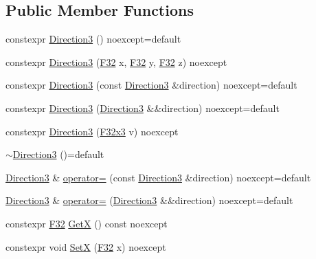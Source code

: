 \subsection*{Public Member Functions}
\begin{DoxyCompactItemize}
\item 
constexpr \mbox{\hyperlink{structmage_1_1_direction3_a64dd4745147f5fd39f710e8b9591074a}{Direction3}} () noexcept=default
\item 
constexpr \mbox{\hyperlink{structmage_1_1_direction3_a880d7413dc6f3742b53a089b870018c7}{Direction3}} (\mbox{\hyperlink{namespacemage_aa97e833b45f06d60a0a9c4fc22ae02c0}{F32}} x, \mbox{\hyperlink{namespacemage_aa97e833b45f06d60a0a9c4fc22ae02c0}{F32}} y, \mbox{\hyperlink{namespacemage_aa97e833b45f06d60a0a9c4fc22ae02c0}{F32}} z) noexcept
\item 
constexpr \mbox{\hyperlink{structmage_1_1_direction3_ad4d5801c6ad4949e0c7b0f4e2fec0ed9}{Direction3}} (const \mbox{\hyperlink{structmage_1_1_direction3}{Direction3}} \&direction) noexcept=default
\item 
constexpr \mbox{\hyperlink{structmage_1_1_direction3_aff1506b32f2b6dd49c2747eca90c76ce}{Direction3}} (\mbox{\hyperlink{structmage_1_1_direction3}{Direction3}} \&\&direction) noexcept=default
\item 
constexpr \mbox{\hyperlink{structmage_1_1_direction3_a9ef3fe2fd9fd55fade378d42eda597c3}{Direction3}} (\mbox{\hyperlink{namespacemage_a1e3c7a882af461f161caa1cbddaf1fa2}{F32x3}} v) noexcept
\item 
\mbox{\hyperlink{structmage_1_1_direction3_a583c087dc366d206aaf54a33bc90c50b}{$\sim$\+Direction3}} ()=default
\item 
\mbox{\hyperlink{structmage_1_1_direction3}{Direction3}} \& \mbox{\hyperlink{structmage_1_1_direction3_a3bbb78215de8d52528c15c2e150d4a53}{operator=}} (const \mbox{\hyperlink{structmage_1_1_direction3}{Direction3}} \&direction) noexcept=default
\item 
\mbox{\hyperlink{structmage_1_1_direction3}{Direction3}} \& \mbox{\hyperlink{structmage_1_1_direction3_a02823d74126254434d8288f103e67fe6}{operator=}} (\mbox{\hyperlink{structmage_1_1_direction3}{Direction3}} \&\&direction) noexcept=default
\item 
constexpr \mbox{\hyperlink{namespacemage_aa97e833b45f06d60a0a9c4fc22ae02c0}{F32}} \mbox{\hyperlink{structmage_1_1_direction3_a8d3ec6086f1b47844331950df3a47207}{GetX}} () const noexcept
\item 
constexpr void \mbox{\hyperlink{structmage_1_1_direction3_a0c2b501a6e30261d872227bb73be8914}{SetX}} (\mbox{\hyperlink{namespacemage_aa97e833b45f06d60a0a9c4fc22ae02c0}{F32}} x) noexcept

\end{DoxyCompactItemize}
